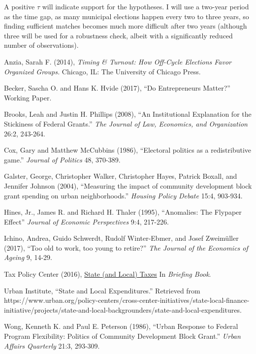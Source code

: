 \documentclass[12pt,a4paper]{article}
\begin{document}
\par A positive $\tau$ will indicate support for the hypotheses. I will use a two-year period as the time gap, as many municipal elections happen every two to three years, so finding sufficient matches becomes much more difficult after two years (although three will be used for a robustness check, albeit with a significantly reduced number of observations).

\newpage

\begin{thebibliography}{9}
Anzia, Sarah F. (2014), \textit{Timing \& Turnout: How Off-Cycle Elections Favor Organized Groups.} Chicago, IL: The University of Chicago Press.

Becker, Sascha O. and Hans K. Hvide (2017), ``Do Entrepreneurs Matter?'' Working Paper.

Brooks, Leah and Justin H. Phillips (2008), ``An Institutional Explanation for the Stickiness of Federal Grants.'' \textit{The Journal of Law, Economics, and Organization} 26:2, 243-264.

Cox, Gary and Matthew McCubbins (1986), ``Electoral politics as a redistributive game.'' \textit{Journal of Politics} 48, 370-389.

Galster, George, Christopher Walker, Christopher Hayes, Patrick Boxall, and Jennifer Johnson (2004), ``Measuring the impact of community development block grant spending on urban neighborhoods.'' \textit{Housing Policy Debate} 15:4, 903-934.

Hines, Jr., James R. and Richard H. Thaler (1995), ``Anomalies: The Flypaper Effect'' \textit{Journal of Economic Perspectives} 9:4, 217-226.

Ichino, Andrea, Guido Schwerdt, Rudolf Winter-Ebmer, and Josef Zweim{\"u}ller (2017), ``Too old to work, too young to retire?'' \textit{The Journal of the Economics of Ageing} 9, 14-29.

Tax Policy Center (2016), \href{https://www.taxpolicycenter.org/sites/default/files/briefing-book/tpc-briefing-book_0.pdf}{State (and Local) Taxes} In \textit{Briefing Book}.

Urban Institute, ``State and Local Expenditures.'' Retrieved from https://www.urban.org/policy-centers/cross-center-initiatives/state-local-finance-initiative/projects/state-and-local-backgrounders/state-and-local-expenditures.

Wong, Kenneth K. and Paul E. Peterson (1986), ``Urban Response to Federal Program Flexibility: Politics of Community Development Block Grant.'' \textit{Urban Affairs Quarterly} 21:3, 293-309.
\end{thebibliography}
\end{document}
